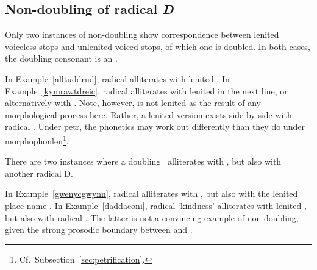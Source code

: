 \subsection{Non-doubling of radical \textit{D}}
\label{sec:non-doubling-radical}
Only two instances of non-doubling show correspondence between lenited voiceless stops and unlenited voiced stops, of which one is doubled. In both cases, the doubling consonant is an \xD.
\begin{mwl}
\end{mwl}
In Example~\ref{alltuddrud}, radical  alliterates with lenited . In Example~\ref{kymrawtdreic},  radical  alliterates with lenited  in the next line, or alternatively with . Note, however,  is not lenited as the result of any morphological process here. Rather, a lenited version exists side by side with radical . Under \gls{petr}, the phonetics may work out differently than they do under \gls{morphophonlen}\footnote{Cf.\  Subsection~\ref{sec:petrification}.}. 

There are two instances where a doubling \xD\ alliterates with \lT, but also with another radical \gls{D}. 
\begin{mwl}
\end{mwl}
In Example~\ref{gwenycgwynn}, radical  alliterates with , but also with the lenited place name . In Example~\ref{daddaeoni}, radical  `kindness' alliterates with  lenited , but also with radical . The latter is not a convincing example of non-doubling, given the strong  prosodic boundary between  and .

